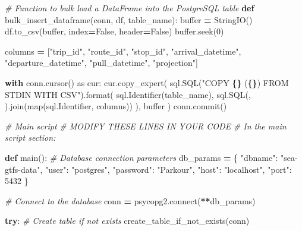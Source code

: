 \documentclass[
  12pt,
]{article}
\newenvironment{Shaded}{\begin{snugshade}}{\end{snugshade}}
\newcommand{\BuiltInTok}[1]{#1}
\newcommand{\CommentTok}[1]{\textcolor[rgb]{0.56,0.35,0.01}{\textit{#1}}}
\newcommand{\ControlFlowTok}[1]{\textcolor[rgb]{0.13,0.29,0.53}{\textbf{#1}}}
\newcommand{\DecValTok}[1]{\textcolor[rgb]{0.00,0.00,0.81}{#1}}
\newcommand{\ExtensionTok}[1]{#1}
\newcommand{\ImportTok}[1]{#1}
\newcommand{\KeywordTok}[1]{\textcolor[rgb]{0.13,0.29,0.53}{\textbf{#1}}}
\newcommand{\NormalTok}[1]{#1}
\newcommand{\OperatorTok}[1]{\textcolor[rgb]{0.81,0.36,0.00}{\textbf{#1}}}
\newcommand{\SpecialCharTok}[1]{\textcolor[rgb]{0.81,0.36,0.00}{\textbf{#1}}}
\newcommand{\StringTok}[1]{\textcolor[rgb]{0.31,0.60,0.02}{#1}}
\newcommand{\VariableTok}[1]{\textcolor[rgb]{0.00,0.00,0.00}{#1}}
\begin{document}
\begin{Shaded}
\begin{Highlighting}[]
\CommentTok{\# Function to bulk load a DataFrame into the PostgreSQL table}
\KeywordTok{def}\NormalTok{ bulk\_insert\_dataframe(conn, df, table\_name):}
    \BuiltInTok{buffer} \OperatorTok{=}\NormalTok{ StringIO()}
\NormalTok{    df.to\_csv(}\BuiltInTok{buffer}\NormalTok{, index}\OperatorTok{=}\VariableTok{False}\NormalTok{, header}\OperatorTok{=}\VariableTok{False}\NormalTok{)}
    \BuiltInTok{buffer}\NormalTok{.seek(}\DecValTok{0}\NormalTok{)}

\NormalTok{    columns }\OperatorTok{=}\NormalTok{ [}\StringTok{"trip\_id"}\NormalTok{, }\StringTok{"route\_id"}\NormalTok{, }\StringTok{"stop\_id"}\NormalTok{, }
               \StringTok{"arrival\_datetime"}\NormalTok{, }\StringTok{"departure\_datetime"}\NormalTok{, }
               \StringTok{"pull\_datetime"}\NormalTok{, }\StringTok{"projection"}\NormalTok{]}

    \ControlFlowTok{with}\NormalTok{ conn.cursor() }\ImportTok{as}\NormalTok{ cur:}
\NormalTok{        cur.copy\_expert(}
\NormalTok{            sql.SQL(}\StringTok{"COPY }\SpecialCharTok{\{\}}\StringTok{ (}\SpecialCharTok{\{\}}\StringTok{) FROM STDIN WITH CSV"}\NormalTok{).}\BuiltInTok{format}\NormalTok{(}
\NormalTok{                sql.Identifier(table\_name),}
\NormalTok{                sql.SQL(}\StringTok{\textquotesingle{}, \textquotesingle{}}\NormalTok{).join(}\BuiltInTok{map}\NormalTok{(sql.Identifier, columns))}
\NormalTok{            ),}
            \BuiltInTok{buffer}
\NormalTok{        )}
\NormalTok{        conn.commit()}

\CommentTok{\# Main script}
\CommentTok{\# MODIFY THESE LINES IN YOUR CODE}
\CommentTok{\# In the main script section:}

\KeywordTok{def}\NormalTok{ main():}
    \CommentTok{\# Database connection parameters}
\NormalTok{    db\_params }\OperatorTok{=}\NormalTok{ \{}
        \StringTok{"dbname"}\NormalTok{: }\StringTok{"sea{-}gtfs{-}data"}\NormalTok{,}
        \StringTok{"user"}\NormalTok{: }\StringTok{"postgres"}\NormalTok{,}
        \StringTok{"password"}\NormalTok{: }\StringTok{"Parkour"}\NormalTok{,}
        \StringTok{"host"}\NormalTok{: }\StringTok{"localhost"}\NormalTok{,}
        \StringTok{"port"}\NormalTok{: }\DecValTok{5432}
\NormalTok{    \}}

    \CommentTok{\# Connect to the database}
\NormalTok{    conn }\OperatorTok{=}\NormalTok{ psycopg2.}\ExtensionTok{connect}\NormalTok{(}\OperatorTok{**}\NormalTok{db\_params)}

    \ControlFlowTok{try}\NormalTok{:}
        \CommentTok{\# Create table if not exists}
\NormalTok{        create\_table\_if\_not\_exists(conn)}
        

\end{Highlighting}
\end{Shaded}
\end{document}
